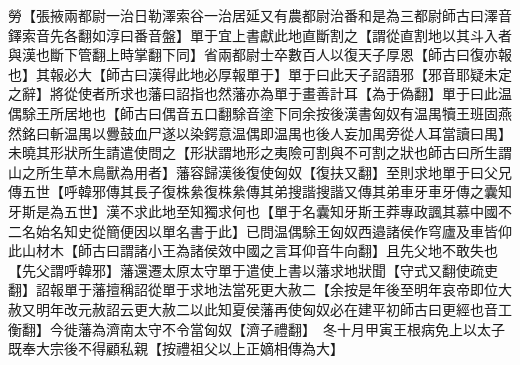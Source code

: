 勞【張掖兩都尉一治日勒澤索谷一治居延又有農都尉治番和是為三都尉師古曰澤音鐸索音先各翻如淳曰番音盤】單于宜上書獻此地直斷割之【謂從直割地以其斗入者與漢也斷下管翻上時掌翻下同】省兩都尉士卒數百人以復天子厚恩【師古曰復亦報也】其報必大【師古曰漢得此地必厚報單于】單于曰此天子詔語邪【邪音耶疑未定之辭】將從使者所求也藩曰詔指也然藩亦為單于畫善計耳【為于偽翻】單于曰此温偶駼王所居地也【師古曰偶音五口翻駼音塗下同余按後漢書匈奴有温禺犢王班固燕然銘曰斬温禺以釁鼓血尸遂以染鍔意温偶即温禺也後人妄加禺旁從人耳當讀曰禺】未曉其形狀所生請遣使問之【形狀謂地形之夷險可割與不可割之狀也師古曰所生謂山之所生草木鳥獸為用者】藩容歸漢後復使匈奴【復扶又翻】至則求地單于曰父兄傳五世【呼韓邪傳其長子復株絫復株絫傳其弟搜諧搜諧又傳其弟車牙車牙傳之囊知牙斯是為五世】漢不求此地至知獨求何也【單于名囊知牙斯王莽專政諷其慕中國不二名始名知史從簡便因以單名書于此】已問温偶駼王匈奴西邉諸侯作穹廬及車皆仰此山材木【師古曰謂諸小王為諸侯效中國之言耳仰音牛向翻】且先父地不敢失也【先父謂呼韓邪】藩還遷太原太守單于遣使上書以藩求地狀聞【守式又翻使疏吏翻】詔報單于藩擅稱詔從單于求地法當死更大赦二【余按是年後至明年哀帝即位大赦又明年改元赦詔云更大赦二以此知夏侯藩再使匈奴必在建平初師古曰更經也音工衡翻】今徙藩為濟南太守不令當匈奴【濟子禮翻】　冬十月甲寅王根病免上以太子既奉大宗後不得顧私親【按禮祖父以上正嫡相傳為大】

